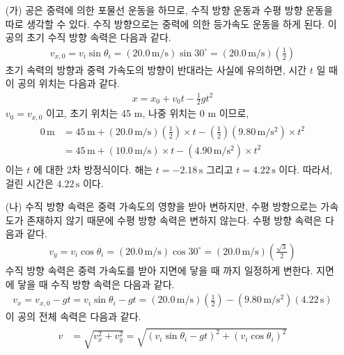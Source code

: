 \documentclass[floatfix,nofootinbib,superscriptaddress,fleqn,preprint]{revtex4}
\begin{document}
\begin{itemize}
  \item[(가)]공은 중력에 의한 포물선 운동을 하므로, 수직 방향 운동과
  수평 방향 운동을 따로 생각할 수 있다. 수직 방향으로는 중력에 의한 등가속도 운동을 하게 된다.
  이 공의 초기 수직 방향 속력은 다음과 같다.
  \begin{align}
    v_{x,0}=v_i\sin{\theta_i}=(20.0\,\mathrm{m/s})\sin{30^\circ}
    =(20.0\,\mathrm{m/s})\left(\frac{1}{2}\right)
  \end{align}
  초기 속력의 방향과 중력 가속도의 방향이 반대라는 사실에 유의하면, 
  시간 $t$ 일 때 이 공의 위치는 다음과 같다.
  \begin{align}
    x=x_0+v_0t-\frac{1}{2}gt^2
  \end{align}
  $v_0=v_{x,0}$ 이고, 초기 위치는 45 m, 나중 위치는 0 m 이므로,
  \begin{align}
    \begin{split} 
      0\,\mathrm{m}&=45\,\mathrm{m}+(20.0\,\mathrm{m/s})
      \left(\frac{1}{2}\right)\times t
      -\left(\frac{1}{2}\right)
      (9.80\,\mathrm{m/s^2})\times t^2 \\
      &=45\,\mathrm{m}+(10.0\,\mathrm{m/s})\times t
      -(4.90\,\mathrm{m/s^2})\times t^2
    \end{split}
  \end{align}
  이는 $t$ 에 대한 2차 방정식이다. 해는 $t=-2.18\,\mathrm{s} $ 
  그리고 $t=4.22\,\mathrm{s}$ 이다. 
  따라서, 걸린 시간은 $4.22\,\mathrm{s}$ 이다.
  \item[(나)] 수직 방향 속력은 중력 가속도의 영향을 받아 변하지만, 
  수평 방향으로는 가속도가 존재하지 않기 때문에 수평 방향 속력은 
  변하지 않는다. 수평 방향 속력은 다음과 같다.
  \begin{align}
    v_y=v_i\cos{\theta_i}=(20.0\,\mathrm{m/s})\cos{30^\circ}
    =(20.0\,\mathrm{m/s})\left(\frac{\sqrt{3}}{2}\right)
  \end{align}
  수직 방향 속력은 중력 가속도를 받아 지면에 닿을 때 까지 일정하게 변한다. 
  지면에 닿을 때 수직 방향 속력은 다음과 같다.
  \begin{align}
    v_x=v_{x,0}-gt=v_i\sin{\theta_i}-gt
    =(20.0\,\mathrm{m/s})\left(\frac{1}{2}\right)
    -(9.80\,\mathrm{m/s^2})(4.22\,\mathrm{s})
  \end{align}
  이 공의 전체 속력은 다음과 같다.
  \begin{align}
    \begin{split}
      v&=\sqrt{v_x^2+v_y^2}=\sqrt{{(v_i\sin{\theta_i}-gt)}^2+{(v_i\cos{\theta_i})}^2} \\

\end{split}
\end{align}
\end{itemize}
\end{document}
